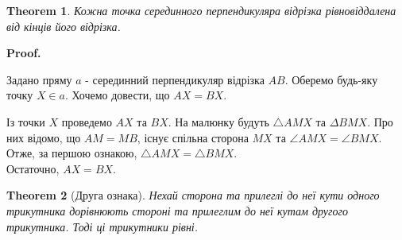 \documentclass[a4paper, 10pt]{article}
\makeatletter
\def\qed{$\blacksquare$}
\theoremstyle{theoremdd}
\newtheorem{theorem}{Theorem}[subsection]
\theoremstyle{theoremdd}
\theoremstyle{theoremdd}
\theoremstyle{theoremdd}
\theoremstyle{theoremdd}
\theoremstyle{theoremdd}
\theoremstyle{theoremdd}
\theoremstyle{theoremdd}
\theoremstyle{theoremdd}
\renewenvironment{proof}[1][Proof.\\]{\par
\pushQED{\hfill \qed}%
\normalfont \topsep6\p@\@plus6\p@\relax
\trivlist
\item\relax
{\bfseries
#1\@addpunct{.}}\hspace\labelsep\ignorespaces
}{%
\popQED\endtrivlist\@endpefalse
}
\makeatother
\begin{document}
\begin{theorem}
Кожна точка серединного перпендикуляра відрізка рівновіддалена від кінців його відрізка.
\end{theorem}

\begin{proof}
Задано пряму $a$ - серединний перпендикуляр відрізка $AB$. Оберемо будь-яку точку $X \in a$. Хочемо довести, що $AX = BX$.
\begin{figure}[H]
\centering
{}
\end{figure}
Із точки $X$ проведемо $AX$ та $BX$. На малюнку будуть $\triangle AMX$ та $\Delta BMX$. Про них відомо, що $AM = MB$, існує спільна сторона $MX$ та $\angle AMX = \angle BMX$. Отже, за першою ознакою, $\triangle AMX = \triangle BMX$.\\
Остаточно, $AX = BX$.
\end{proof}

\begin{theorem}[Друга ознака]
Нехай сторона та прилеглі до неї кути одного трикутника дорівнюють стороні та прилеглим до неї кутам другого трикутника. Тоді ці трикутники рівні.
\end{theorem}
\end{document}
